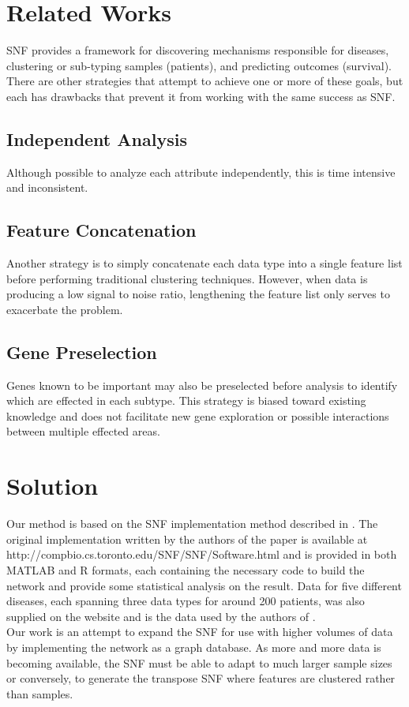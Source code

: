 \documentclass[12pt]{article}
\begin{document}
\section*{Related Works}
\quad SNF provides a framework for discovering mechanisms responsible for diseases, clustering or sub-typing samples (patients), and predicting outcomes (survival). There are other strategies that attempt to achieve one or more of these goals, but each has drawbacks that prevent it from working with the same success as SNF.\\
\subsection*{Independent Analysis}
\quad Although possible to analyze each attribute independently, this is time intensive and inconsistent.
\subsection*{Feature Concatenation}
\quad Another strategy is to simply concatenate each data type into a single feature list before performing traditional clustering techniques. However, when data is producing a low signal to noise ratio, lengthening the feature list only serves to exacerbate the problem. 
\subsection*{Gene Preselection}
\quad Genes known to be important may also be preselected before analysis to identify which are effected in each subtype. This strategy is biased toward existing knowledge and does not facilitate new gene exploration or possible interactions between multiple effected areas.

\section*{Solution}
\quad Our method is based on the SNF implementation method described in \cite{snf-nat}. The original implementation written by the authors of the paper is available at http://compbio.cs.toronto.edu/SNF/SNF/Software.html and is provided in both MATLAB and R formats, each containing the necessary code to build the network and provide some statistical analysis on the result. Data for five different diseases, each spanning three data types for around 200 patients, was also supplied on the website and is the data used by the authors of \cite{snf-nat}.\\
\quad Our work is an attempt to expand the SNF for use with higher volumes of data by implementing the network as a graph database. As more and more data is becoming available, the SNF must be able to adapt to much larger sample sizes or conversely, to generate the transpose SNF where features are clustered rather than samples.\\
\end{document}
